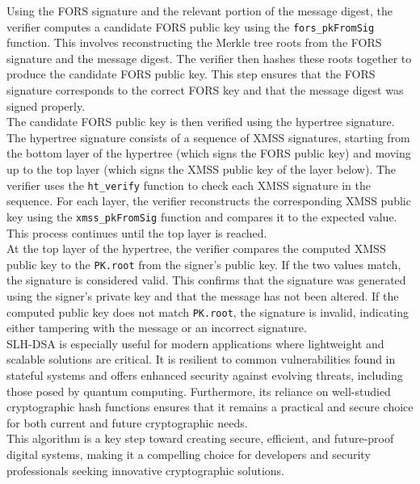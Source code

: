 \documentclass[journal=tosc,notanonymous]{iacrtrans}
\begin{document}
Using the FORS signature and the relevant portion of the message digest, the verifier computes a candidate FORS public key using the \verb|fors_pkFromSig| function. This involves reconstructing the Merkle tree roots from the FORS signature and the message digest. The verifier then hashes these roots together to produce the candidate FORS public key. This step ensures that the FORS signature corresponds to the correct FORS key and that the message digest was signed properly.\\
The candidate FORS public key is then verified using the hypertree signature. The hypertree signature consists of a sequence of XMSS signatures, starting from the bottom layer of the hypertree (which signs the FORS public key) and moving up to the top layer (which signs the XMSS public key of the layer below). The verifier uses the \verb|ht_verify| function to check each XMSS signature in the sequence. For each layer, the verifier reconstructs the corresponding XMSS public key using the \verb|xmss_pkFromSig| function and compares it to the expected value. This process continues until the top layer is reached.\\
At the top layer of the hypertree, the verifier compares the computed XMSS public key to the \texttt{PK.root} from the signer's public key. If the two values match, the signature is considered valid. This confirms that the signature was generated using the signer's private key and that the message has not been altered. If the computed public key does not match \texttt{PK.root}, the signature is invalid, indicating either tampering with the message or an incorrect signature. \cite{national-institute-of-standards-and-technology-2024}\\
\newline
SLH-DSA is especially useful for modern applications where lightweight and scalable solutions are critical. It is resilient to common vulnerabilities found in stateful systems and offers enhanced security against evolving threats, including those posed by quantum computing. Furthermore, its reliance on well-studied cryptographic hash functions ensures that it remains a practical and secure choice for both current and future cryptographic needs.
\\
This algorithm is a key step toward creating secure, efficient, and future-proof digital systems, making it a compelling choice for developers and security professionals seeking innovative cryptographic solutions.

\end{document}
